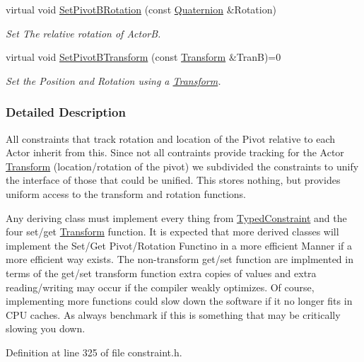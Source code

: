 \begin{DoxyCompactItemize}
virtual void \hyperlink{classMezzanine_1_1DualTransformConstraint_ab25460e03f187dd56657e43e6302ef45}{SetPivotBRotation} (const \hyperlink{classMezzanine_1_1Quaternion}{Quaternion} \&Rotation)
\begin{DoxyCompactList}\small\item\em Set The relative rotation of ActorB. \item\end{DoxyCompactList}\item 
virtual void \hyperlink{classMezzanine_1_1DualTransformConstraint_ac5ee69ce5d68f4e299e7916f764ee396}{SetPivotBTransform} (const \hyperlink{classMezzanine_1_1Transform}{Transform} \&TranB)=0
\begin{DoxyCompactList}\small\item\em Set the Position and Rotation using a \hyperlink{classMezzanine_1_1Transform}{Transform}. \item\end{DoxyCompactList}\end{DoxyCompactItemize}


\subsubsection{Detailed Description}
All constraints that track rotation and location of the Pivot relative to each Actor inherit from this. Since not all contraints provide tracking for the Actor \hyperlink{classMezzanine_1_1Transform}{Transform} (location/rotation of the pivot) we subdivided the constraints to unify the interface of those that could be unified. This stores nothing, but provides uniform access to the transform and rotation functions. \par
 \par
 Any deriving class must implement every thing from \hyperlink{classMezzanine_1_1TypedConstraint}{TypedConstraint} and the four set/get \hyperlink{classMezzanine_1_1Transform}{Transform} function. It is expected that more derived classes will implement the Set/Get Pivot/Rotation Functino in a more efficient Manner if a more efficient way exists. The non-\/transform get/set function are implmented in terms of the get/set transform function extra copies of values and extra reading/writing may occur if the compiler weakly optimizes. Of course, implementing more functions could slow down the software if it no longer fits in CPU caches. As always benchmark if this is something that may be critically slowing you down. 

Definition at line 325 of file constraint.h.



